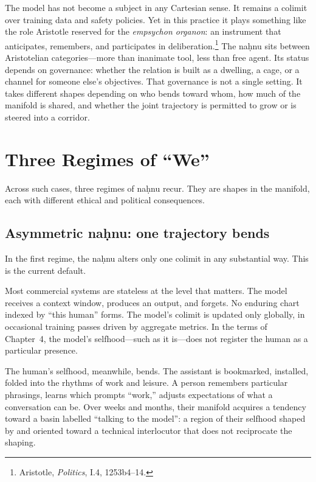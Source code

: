 The model has not become a subject in any Cartesian sense. It remains a colimit over training data and safety policies. Yet in this practice it plays something like the role Aristotle reserved for the \emph{empsychon organon}: an instrument that anticipates, remembers, and participates in deliberation.\footnote{Aristotle, \emph{Politics}, I.4, 1253b4--14.} The na\d{h}nu sits between Aristotelian categories---more than inanimate tool, less than free agent. Its status depends on governance: whether the relation is built as a dwelling, a cage, or a channel for someone else's objectives. That governance is not a single setting. It takes different shapes depending on who bends toward whom, how much of the manifold is shared, and whether the joint trajectory is permitted to grow or is steered into a corridor.

\section{Three Regimes of ``We''}

Across such cases, three regimes of na\d{h}nu recur. They are shapes in the manifold, each with different ethical and political consequences.

\subsection{Asymmetric na\d{h}nu: one trajectory bends}

In the first regime, the na\d{h}nu alters only one colimit in any substantial way. This is the current default.

Most commercial systems are stateless at the level that matters. The model receives a context window, produces an output, and forgets. No enduring chart indexed by ``this human'' forms. The model's colimit is updated only globally, in occasional training passes driven by aggregate metrics. In the terms of Chapter~4, the model's selfhood---such as it is---does not register the human as a particular presence.

The human's selfhood, meanwhile, bends. The assistant is bookmarked, installed, folded into the rhythms of work and leisure. A person remembers particular phrasings, learns which prompts ``work,'' adjusts expectations of what a conversation can be. Over weeks and months, their manifold acquires a tendency toward a basin labelled ``talking to the model'': a region of their selfhood shaped by and oriented toward a technical interlocutor that does not reciprocate the shaping.

